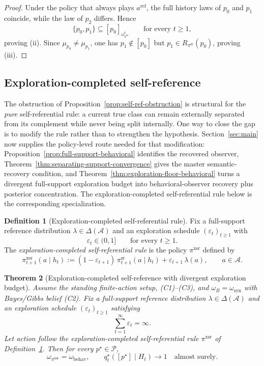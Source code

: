 \documentclass[11pt]{article}
\newtheorem{theorem}{Theorem}[section]
\theoremstyle{definition}
\newtheorem{definition}[theorem]{Definition}
\theoremstyle{remark}
\newcommand{\Acal}{\mathcal{A}}
\newcommand{\Pcal}{\mathcal{P}}
\begin{document}
\begin{proof}
Under the policy that always plays $a^{\mathrm{ref}}$, the full history laws of $p_0$ and $p_1$ coincide, while the law of $p_2$ differs. Hence
\[
\{p_0,p_1\}\subseteq [p_0]_{\omega_{\pi^{\mathrm{sr}}}^t}
\qquad\text{for every }t\ge 1,
\]
proving (ii). Since $\mu_{p_0}\neq\mu_{p_1}$, one has $p_1\notin[p_0]$ but $p_1\in R_{\pi^{\mathrm{sr}}}(p_0)$, proving (iii).
\end{proof}

\subsection{Exploration-completed self-reference}
\label{sec:self-ref-exploration}

The obstruction of Proposition~\ref{prop:self-ref-obstruction} is structural for the \emph{pure} self-referential rule: a current true class can remain externally separated from its complement while never being split internally. One way to close the gap is to modify the rule rather than to strengthen the hypothesis. Section~\ref{sec:main} now supplies the policy-level route needed for that modification: Proposition~\ref{prop:full-support-behavioral} identifies the recovered observer, Theorem~\ref{thm:separating-support-convergence} gives the master semantic-recovery condition, and Theorem~\ref{thm:exploration-floor-behavioral} turns a divergent full-support exploration budget into behavioral-observer recovery plus posterior concentration. The exploration-completed self-referential rule below is the corresponding specialization.

\begin{definition}[Exploration-completed self-referential rule]
\label{def:self-ref-exploratory}
Fix a full-support reference distribution $\lambda\in\Delta(\Acal)$ and an exploration schedule $(\varepsilon_t)_{t\ge 1}$ with
\[
\varepsilon_t\in(0,1]
\qquad\text{for every }t\ge 1.
\]
The \emph{exploration-completed self-referential rule} is the policy $\pi^{\mathrm{xsr}}$ defined by
\[
\pi_{t+1}^{\mathrm{xsr}}(a\mid h_t)
:=
(1-\varepsilon_{t+1})\,\pi_{t+1}^{\mathrm{sr}}(a\mid h_t)+\varepsilon_{t+1}\,\lambda(a),
\qquad
a\in\Acal.
\]
\end{definition}

\begin{theorem}[Exploration-completed self-reference with divergent exploration budget]
\label{thm:self-ref-exploratory}
Assume the standing finite-action setup, \textup{(C1)--(C3)}, and $\omega_B=\omega_{\mathrm{syn}}$ with Bayes/Gibbs belief \textup{(C2)}. Fix a full-support reference distribution $\lambda\in\Delta(\Acal)$ and an exploration schedule $(\varepsilon_t)_{t\ge 1}$ satisfying
\[
\sum_{t=1}^{\infty}\varepsilon_t=\infty.
\]
Let action follow the exploration-completed self-referential rule $\pi^{\mathrm{xsr}}$ of Definition~\ref{def:self-ref-exploratory}. Then for every $p^\star\in\Pcal$,
\[
\omega_{\pi^{\mathrm{xsr}}}=\omega_{\mathrm{behav}},
\qquad
q_t^\star([p^\star]\mid H_t)\longrightarrow 1
\quad\text{almost surely.}
\]
\end{theorem}
\end{document}
